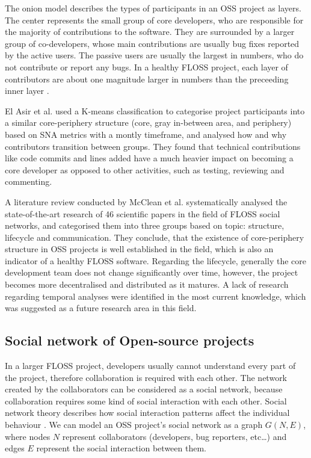The onion model describes the types of participants in an OSS project as layers. The center represents the small group of core developers, who are responsible for the majority of contributions to the software. They are surrounded by a larger group of co-developers, whose main contributions are usually bug fixes reported by the active users. The passive users are usually the largest in numbers, who do not contribute or report any bugs. In a healthy FLOSS project, each layer of contributors are about one magnitude larger in numbers than the preceeding inner layer \cite{mockusTwoCaseStudies2002}.

El Asir et al. \cite{elasriPeripheryCoreTemporal2017} used a K-means classification to categorise project participants into a similar core-periphery structure (core, gray in-between area, and periphery) based on SNA metrics with a montly timeframe, and analysed how and why contributors transition between groups. They found that technical contributions like code commits and lines added have a much heavier impact on becoming a core developer as opposed to other activities, such as testing, reviewing and commenting.

A literature review conducted by McClean et al. \cite{mccleanSocialNetworkAnalysis2021} systematically analysed the state-of-the-art research of 46 scientific papers in the field of FLOSS social networks, and categorised them into three groups based on topic: structure, lifecycle and communication. They conclude, that the existence of core-periphery structure in OSS projects is well established in the field, which is also an indicator of a healthy FLOSS software. Regarding the lifecycle, generally the core development team does not change significantly over time, however, the project becomes more decentralised and distributed as it matures. A lack of research regarding temporal analyses were identified in the most current knowledge, which was suggested as a future research area in this field.

\subsection{Social network of Open-source projects}
In a larger FLOSS project, developers usually cannot understand every part of the project, therefore collaboration is required with each other. The network created by the collaborators can be considered as a social network, because collaboration requires some kind of social interaction with each other. Social network theory describes how social interaction patterns affect the individual behaviour \cite{martinez-torresGeneticSearchPatterns2012}. We can model an OSS project's social network as a graph $G(N, E)$, where nodes $N$ represent collaborators (developers, bug reporters, etc\dots) and edges $E$ represent the social interaction between them. 

